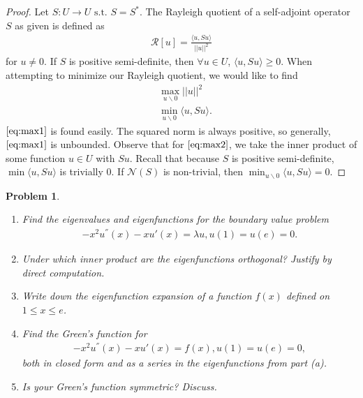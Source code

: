 \documentclass[12pt]{article}
\newtheorem{problem}{Problem}
\begin{document}
\begin{proof}
Let $S: U \rightarrow U \text{ s.t. } S = S^*$. The Rayleigh quotient of a self-adjoint operator $S$ as given is defined as 
\begin{align}
    \mathcal{R}[u] = \frac{\langle u, Su\rangle}{||u||^2} \label{eq:rq}
\end{align}
for $u\neq 0$. If $S$ is positive semi-definite, then $\forall u \in U$, $\langle u, Su \rangle \geq 0$. When attempting to minimize our Rayleigh quotient, we would like to find
\begin{align}
    & \max_{u \backslash 0} ||u||^2 \label{eq:max1}\\
    & \min_{u\backslash 0}\langle u, Su \rangle. \label{eq:max2}
\end{align}
$\ref{eq:max1}$ is found easily. The squared norm is always positive, so generally, $\ref{eq:max1}$ is unbounded. Observe that for $\ref{eq:max2}$, we take the inner product of some function $u \in U$ with $Su$. Recall that because $S$ is positive semi-definite, $\min\langle u, Su \rangle$ is trivially 0. If $\mathcal{N}(S)$ is non-trivial, then $\min_{u\backslash 0}\langle u, Su \rangle = 0$.
\end{proof}


\newpage
\begin{problem}
\begin{enumerate}[label=(\alph*)]
    \; 
    \item Find the eigenvalues and eigenfunctions for the boundary value problem
    \begin{align*}
        \label{eq:bvp1}
        -x^2u^{''}(x)-xu'(x) = \lambda u, u(1) = u(e) = 0.
    \end{align*}
    \item Under which inner product are the eigenfunctions orthogonal? Justify by direct computation.
    \item Write down the eigenfunction expansion of a function $f(x)$ defined on $1 \leq x \leq e$.
    \item Find the Green's function for
    \begin{align*}
        \label{eq:bvp2}
        -x^2u^{''}(x) - xu'(x)=f(x), u(1) = u(e) = 0,
    \end{align*}
    both in closed form and as a series in the eigenfunctions from part (a).
    \item Is your Green's function symmetric? Discuss.
\end{enumerate}
\end{problem}
\end{document}
